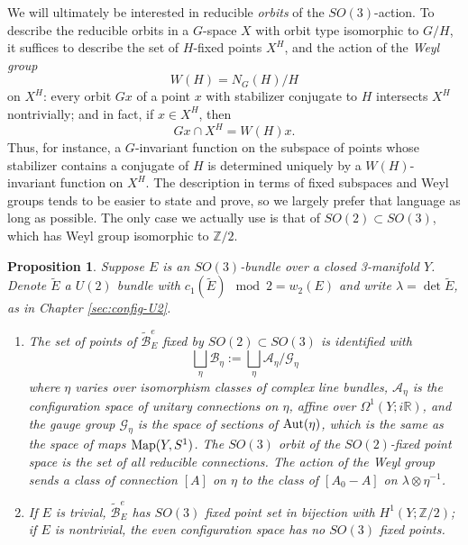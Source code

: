 \documentclass{memo-l}
\newtheorem{proposition}[theorem]{Proposition}
\theoremstyle{definition}
\theoremstyle{remark}
\numberwithin{section}{chapter}
\numberwithin{equation}{chapter}
\begin{document}
We will ultimately be interested in reducible \textit{orbits} of the $SO(3)$-action. To describe the reducible orbits in a $G$-space $X$ with orbit type isomorphic to $G/H$, it suffices to describe the set of $H$-fixed points $X^H$, and the action of the \textit{Weyl group} 
$$W(H) = N_G(H)/H$$ 
on $X^H$: every orbit $Gx$ of a point $x$ with stabilizer conjugate to $H$ intersects $X^H$ nontrivially; and in fact, if $x \in X^H$, then 
$$Gx \cap X^H = W(H)x.$$ 
Thus, for instance, a $G$-invariant function on the subspace of points whose stabilizer contains a conjugate of $H$ is determined uniquely by a $W(H)$-invariant function on $X^H$. The description in terms of fixed subspaces and Weyl groups tends to be easier to state and prove, so we largely prefer that language as long as possible. The only case we actually use is that of $SO(2) \subset SO(3)$, which has Weyl group isomorphic to $\mathbb Z/2$.

\begin{proposition}\label{action1}Suppose $E$ is an $SO(3)$-bundle over a closed 3-manifold $Y$. Denote $\tilde E$ a $U(2)$ bundle with $c_1(\tilde E) \mod 2 = w_2(E)$ and write $\lambda = \det{\tilde{E}}$, as in Chapter \ref{sec:config-U2}.\begin{enumerate}
\item The set of points of $\widetilde{\mathcal B}^e_E$ fixed by $SO(2) \subset SO(3)$ is identified with $$\bigsqcup_\eta \mathcal B_\eta := \bigsqcup_\eta \mathcal A_\eta/\mathcal G_\eta$$ where $\eta$ varies over isomorphism classes of complex line bundles, $\mathcal A_\eta$ is the configuration space of unitary connections on $\eta$, affine over $\Omega^1(Y;i\mathbb R)$, and the gauge group $\mathcal G_\eta$ is the space of sections of $\textup{Aut}(\eta)$, which is the same as the space of maps $\textup{Map}(Y, S^1)$. The $SO(3)$ orbit of the $SO(2)$-fixed point space is the set of all reducible connections. The action of the Weyl group sends a class of connection $[A]$ on $\eta$ to the class of $[A_0 - A]$ on $\lambda \otimes \eta^{-1}$.
\item If $E$ is trivial, $\widetilde{\mathcal B}^e_E$ has $SO(3)$ fixed point set in bijection with $H^1(Y;\mathbb Z/2)$; if $E$ is nontrivial, the even configuration space has no $SO(3)$ fixed points.
\end{enumerate}
\end{proposition}
\end{document}
